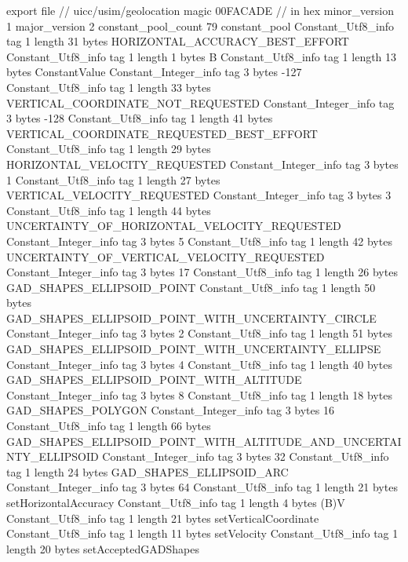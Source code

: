 export file {		// uicc/usim/geolocation
	magic	00FACADE		 // in hex
	minor_version	1
	major_version	2
	constant_pool_count	79
	constant_pool {
		Constant_Utf8_info {
			tag	1
			length	31
			bytes	HORIZONTAL_ACCURACY_BEST_EFFORT
		}
		Constant_Utf8_info {
			tag	1
			length	1
			bytes	B
		}
		Constant_Utf8_info {
			tag	1
			length	13
			bytes	ConstantValue
		}
		Constant_Integer_info {
			tag	3
			bytes	-127
		}
		Constant_Utf8_info {
			tag	1
			length	33
			bytes	VERTICAL_COORDINATE_NOT_REQUESTED
		}
		Constant_Integer_info {
			tag	3
			bytes	-128
		}
		Constant_Utf8_info {
			tag	1
			length	41
			bytes	VERTICAL_COORDINATE_REQUESTED_BEST_EFFORT
		}
		Constant_Utf8_info {
			tag	1
			length	29
			bytes	HORIZONTAL_VELOCITY_REQUESTED
		}
		Constant_Integer_info {
			tag	3
			bytes	1
		}
		Constant_Utf8_info {
			tag	1
			length	27
			bytes	VERTICAL_VELOCITY_REQUESTED
		}
		Constant_Integer_info {
			tag	3
			bytes	3
		}
		Constant_Utf8_info {
			tag	1
			length	44
			bytes	UNCERTAINTY_OF_HORIZONTAL_VELOCITY_REQUESTED
		}
		Constant_Integer_info {
			tag	3
			bytes	5
		}
		Constant_Utf8_info {
			tag	1
			length	42
			bytes	UNCERTAINTY_OF_VERTICAL_VELOCITY_REQUESTED
		}
		Constant_Integer_info {
			tag	3
			bytes	17
		}
		Constant_Utf8_info {
			tag	1
			length	26
			bytes	GAD_SHAPES_ELLIPSOID_POINT
		}
		Constant_Utf8_info {
			tag	1
			length	50
			bytes	GAD_SHAPES_ELLIPSOID_POINT_WITH_UNCERTAINTY_CIRCLE
		}
		Constant_Integer_info {
			tag	3
			bytes	2
		}
		Constant_Utf8_info {
			tag	1
			length	51
			bytes	GAD_SHAPES_ELLIPSOID_POINT_WITH_UNCERTAINTY_ELLIPSE
		}
		Constant_Integer_info {
			tag	3
			bytes	4
		}
		Constant_Utf8_info {
			tag	1
			length	40
			bytes	GAD_SHAPES_ELLIPSOID_POINT_WITH_ALTITUDE
		}
		Constant_Integer_info {
			tag	3
			bytes	8
		}
		Constant_Utf8_info {
			tag	1
			length	18
			bytes	GAD_SHAPES_POLYGON
		}
		Constant_Integer_info {
			tag	3
			bytes	16
		}
		Constant_Utf8_info {
			tag	1
			length	66
			bytes	GAD_SHAPES_ELLIPSOID_POINT_WITH_ALTITUDE_AND_UNCERTAINTY_ELLIPSOID
		}
		Constant_Integer_info {
			tag	3
			bytes	32
		}
		Constant_Utf8_info {
			tag	1
			length	24
			bytes	GAD_SHAPES_ELLIPSOID_ARC
		}
		Constant_Integer_info {
			tag	3
			bytes	64
		}
		Constant_Utf8_info {
			tag	1
			length	21
			bytes	setHorizontalAccuracy
		}
		Constant_Utf8_info {
			tag	1
			length	4
			bytes	(B)V
		}
		Constant_Utf8_info {
			tag	1
			length	21
			bytes	setVerticalCoordinate
		}
		Constant_Utf8_info {
			tag	1
			length	11
			bytes	setVelocity
		}
		Constant_Utf8_info {
			tag	1
			length	20
			bytes	setAcceptedGADShapes
		}
}}
